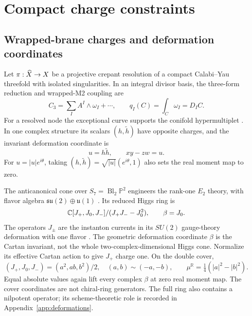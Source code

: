 \section{Compact charge constraints}
\label{sec:compact-gauging}\label{sec:local-sectors}

\subsection{Wrapped-brane charges and deformation coordinates}
\label{subsec:m2-charges}

Let $\pi:\widehat X\to X$ be a projective crepant resolution of a
compact Calabi--Yau threefold with isolated singularities. In an
integral divisor basis, the three-form reduction and wrapped-M2
coupling are
\begin{equation}
 C_3=\sum_I A^I\wedge\omega_I+\cdots,\qquad
 q_I(C)=\int_C\omega_I=D_I C.
 \label{eq:c3-reduction}
\end{equation}
For a resolved node the exceptional curve supports the conifold
hypermultiplet \cite{Greene:1995hu,Katz:1996,Mohaupt:2004de}.
In one complex structure its scalars $(h,\widetilde h)$ have
opposite charges, and the invariant deformation coordinate is
\begin{equation}
 u=h\widetilde h,\qquad xy-zw=u.
 \label{eq:conifold-map}
\end{equation}
For $u=|u|e^{i\theta}$, taking
$(h,\widetilde h)=\sqrt{|u|}(e^{i\theta},1)$ also sets the
real moment map to zero.

The anticanonical cone over $S_7=\operatorname{Bl}_2\mathbb P^2$
engineers the rank-one $E_2$ theory, with flavor algebra
$\mathfrak{su}(2)\oplus\mathfrak u(1)$
\cite{Seiberg:1996,Morrison:1996pp}. Its reduced Higgs ring is
\begin{equation}
 \mathbb C[J_+,J_0,J_-]/(J_+J_--J_0^2),\qquad \beta=J_0.
 \label{eq:e2-reduced}
\end{equation}
The operators $J_\pm$ are the instanton currents in its
$SU(2)$ gauge-theory deformation with one flavor
\cite{Cremonesi:2015lsa}. The geometric deformation coordinate
$\beta$ is the Cartan invariant, not the whole two-complex-dimensional
Higgs cone. Normalize its effective Cartan action to give $J_+$
charge one. On the double cover,
\begin{equation}
 (J_+,J_0,J_-)=(a^2,ab,b^2)/2,\quad(a,b)\sim(-a,-b),\qquad
 \mu^{\mathbb R}=\tfrac14(|a|^2-|b|^2).
 \label{eq:e2-double-cover}
\end{equation}
Equal absolute values again lift every complex $\beta$ at zero
real moment map. The cover coordinates are not chiral-ring
generators. The full ring also contains a nilpotent operator;
its scheme-theoretic role is recorded in Appendix~\ref{app:deformations}.


